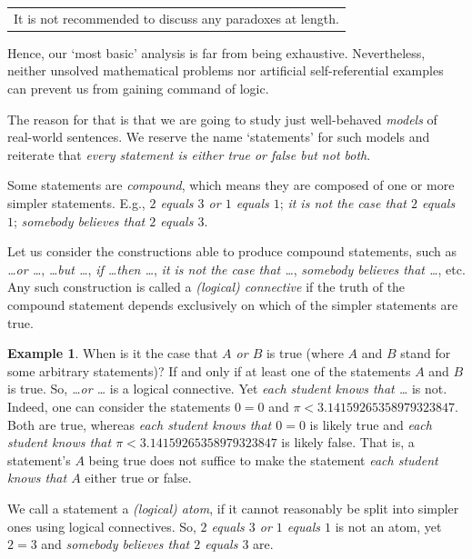 \documentclass[12pt,notitlepage]{article}
\theoremstyle{plain}
\theoremstyle{definition}
\newtheorem{exm}[thm]{Example}
\theoremstyle{plain}
\newcommand{\1}{\mathbf{1}}
\newcommand{\0}{\mathbf{0}}
\newcommand{\mcomm}[1]{
\medskip\noindent\begin{tabular}{| l}
\parbox{0.99\textwidth}{{\small
#1 }}\end{tabular}
\smallskip}
\begin{document}
\mcomm{It is not recommended to discuss any paradoxes at length.}

Hence, our `most basic' analysis is far from being exhaustive. Nevertheless, neither unsolved mathematical problems nor artificial self-referential examples can prevent us from gaining command of logic.

The reason for that is that we are going to study just well-behaved \emph{models} of real-world sentences. We reserve the name `statements' for such models and reiterate that \emph{every statement is either true or false but not both}.

\medskip
Some statements are \emph{compound}, which means they are composed of one or more simpler statements. E.g., \emph{$2$ equals $3$ or $1$ equals $1$}; \emph{it is not the case that $2$ equals $1$}; \emph{somebody believes that $2$ equals $3$}.

Let us consider the constructions able to produce compound statements, such as \emph{\dots or \dots}, \emph{\dots but \dots}, \emph{if \dots then \dots}, \emph{it is not the case that \dots}, \emph{somebody believes that \dots}, etc. Any such construction is called a \emph{(logical) connective} if the truth of the compound statement depends exclusively on which of the simpler statements are true.
\begin{exm}\label{L1:exm_pi}
When is it the case that \emph{$A$ or $B$} is true (where $A$ and $B$ stand for some arbitrary statements)? If and only if at least one of the statements  $A$ and $B$ is true. So, \emph{\dots or \dots} is a logical connective. Yet \emph{each student knows that \dots} is not. Indeed, one can consider the statements $0 = 0$ and $\pi < 3.14159265358979323847$. Both are true, whereas \emph{each student knows that $0 = 0$} is likely true and \emph{each student knows that $\pi < 3.14159265358979323847$} is likely false. That is, a statement's $A$ being true does not  suffice to make the statement \emph{each student knows that $A$} either true or false.
\end{exm}

We call a statement a \emph{(logical) atom}, if it cannot reasonably be split into simpler ones using logical connectives. So, \emph{$2$ equals $3$ or $1$ equals $1$} is not an atom, yet $2 = 3$ and \emph{somebody believes that $2$ equals $3$} are.
\end{document}
